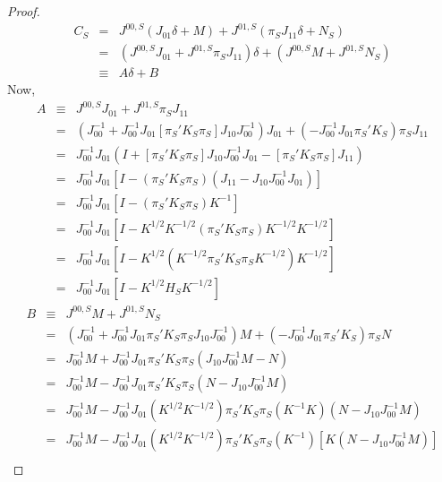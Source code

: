 \documentclass[12pt]{article}
\theoremstyle{definition}
\begin{document}
\begin{proof}
	\begin{eqnarray*}
		C_S &=& J^{00,S}\left(J_{01}\delta + M\right) + J^{01,S}\left( \pi_S J_{11}\delta + N_S\right)\\
			&=& \left(J^{00,S}J_{01} + J^{01,S} \pi_S J_{11}\right)\delta + \left( J^{00,S}M + J^{01,S} N_S\right)\\
			&\equiv& A\delta + B
\end{eqnarray*}
Now, 
	\begin{eqnarray*}
		A &\equiv& J^{00,S}J_{01} + J^{01,S} \pi_S J_{11} \\
			&=& \left(J_{00}^{-1} + J_{00}^{-1}J_{01}\left[\pi_S'K_S\pi_S \right]J_{10}J_{00}^{-1}\right) J_{01} + \left( -J_{00}^{-1}J_{01}\pi_S'K_S\right) \pi_S J_{11}\\
			&=& J_{00}^{-1}J_{01}\left( I + \left[\pi_S'K_S\pi_S \right]J_{10}J_{00}^{-1}J_{01} -  \left[\pi_S'K_S\pi_S \right]J_{11} \right)\\
			&=&J_{00}^{-1}J_{01}\left[ I -  \left(\pi_S'K_S\pi_S \right)\left(J_{11} -  J_{10}J_{00}^{-1}J_{01}\right) \right]\\
			&=&J_{00}^{-1}J_{01}\left[ I -  \left(\pi_S'K_S\pi_S \right)K^{-1}\right]\\
			&=&J_{00}^{-1}J_{01}\left[ I -  K^{1/2}K^{-1/2}\left(\pi_S'K_S\pi_S \right)K^{-1/2}K^{-1/2}\right]\\
			&=&J_{00}^{-1}J_{01}\left[ I -  K^{1/2}\left(K^{-1/2}\pi_S'K_S\pi_S K^{-1/2}\right)K^{-1/2}\right]\\
			&=&J_{00}^{-1}J_{01}\left[ I -  K^{1/2}H_SK^{-1/2}\right]
	\end{eqnarray*}
	\begin{eqnarray*}
		B &\equiv&  J^{00,S}M + J^{01,S} N_S\\
			&=& \left(J_{00}^{-1} + J_{00}^{-1}J_{01}\pi_S'K_S\pi_S J_{10}J_{00}^{-1}\right) M + \left( -J_{00}^{-1}J_{01}\pi_S'K_S\right) \pi_S N\\
			&=& J_{00}^{-1}M  + J_{00}^{-1}J_{01}\pi_S'K_S\pi_S\left( J_{10}J_{00}^{-1}M - N\right)  \\
			&=& J_{00}^{-1}M  - J_{00}^{-1}J_{01}\pi_S'K_S\pi_S\left(N - J_{10}J_{00}^{-1}M\right)  \\
			&=& J_{00}^{-1}M  - J_{00}^{-1}J_{01}\left(K^{1/2}K^{-1/2}\right)\pi_S'K_S\pi_S\left(K^{-1}K\right)\left(N - J_{10}J_{00}^{-1}M\right)  \\
			&=& J_{00}^{-1}M  - J_{00}^{-1}J_{01}\left(K^{1/2}K^{-1/2}\right)\pi_S'K_S\pi_S\left(K^{-1}\right)\left[K\left(N - J_{10}J_{00}^{-1}M\right)\right]  \\

\end{eqnarray*}
\end{proof}
\end{document}
